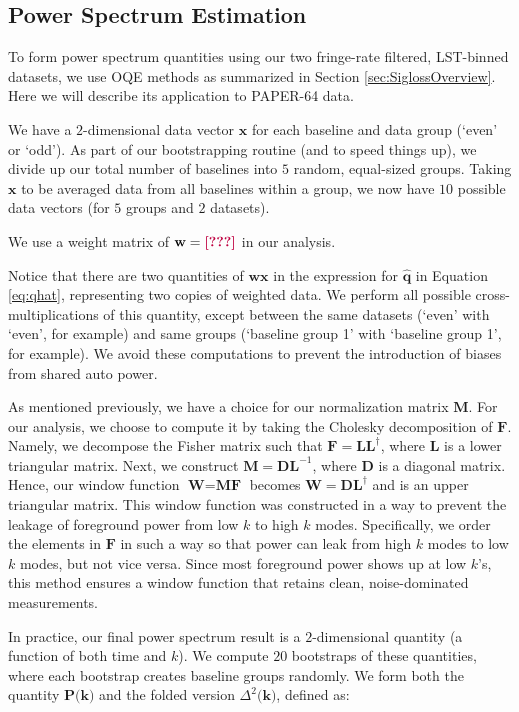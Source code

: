 \documentclass[preprint2,numberedappendix,tighten,twocolappendix]{aastex6}  %
\newcommand{\cc}[1]{{\color{purple} \textbf{[#1]}}}
\begin{document}
\subsection{Power Spectrum Estimation}
\label{sec:PS}

To form power spectrum quantities using our two fringe-rate filtered, LST-binned datasets, we use OQE methods as summarized in Section \ref{sec:SiglossOverview}. Here we will describe its application to PAPER-64 data. 

We have a $2$-dimensional data vector $\textbf{x}$ for each baseline and data group (`even' or `odd'). As part of our bootstrapping routine (and to speed things up), we divide up our total number of baselines into $5$ random, equal-sized groups. Taking $\textbf{x}$ to be averaged data from all baselines within a group, we now have $10$ possible data vectors (for $5$ groups and $2$ datasets). 

We use a weight matrix of $\textbf{w} = \cc{???}$ in our analysis.

Notice that there are two quantities of $\textbf{w}\textbf{x}$ in the expression for $\hat{\textbf{q}}$ in Equation \ref{eq:qhat}, representing two copies of weighted data. We perform all possible cross-multiplications of this quantity, except between the same datasets (`even' with `even', for example) and same groups (`baseline group 1' with `baseline group 1', for example). We avoid these computations to prevent the introduction of biases from shared auto power.

As mentioned previously, we have a choice for our normalization matrix $\textbf{M}$. For our analysis, we choose to compute it by taking the Cholesky decomposition of $\textbf{F}$. Namely, we decompose the Fisher matrix such that $\textbf{F} = \textbf{L}\textbf{L}^{\dagger}$, where $\textbf{L}$ is a lower triangular matrix. Next, we construct $\textbf{M} = \textbf{D}\textbf{L}^{-1}$, where \textbf{D} is a diagonal matrix. Hence, our window function $\textbf{W} = \textbf{MF}$ becomes $\textbf{W} = \textbf{D}\textbf{L}^{\dagger}$ and is an upper triangular matrix. This window function was constructed in a way to prevent the leakage of foreground power from low $k$ to high $k$ modes. Specifically, we order the elements in $\textbf{F}$ in such a way so that power can leak from high $k$ modes to low $k$ modes, but not vice versa. Since most foreground power shows up at low $k$'s, this method ensures a window function that retains clean, noise-dominated measurements.

In practice, our final power spectrum result is a $2$-dimensional quantity (a function of both time and $k$). We compute $20$ bootstraps of these quantities, where each bootstrap creates baseline groups randomly. We form both the quantity $\textbf{P(k)}$ and the folded version $\Delta^{2}\textbf{(k)}$, defined as:
\end{document}
